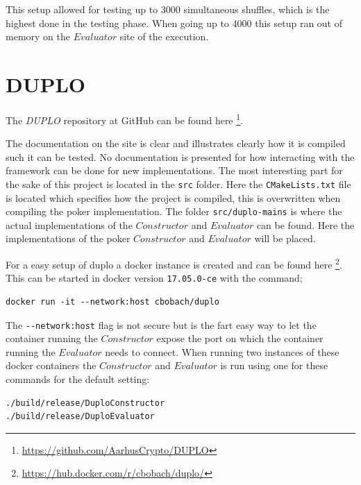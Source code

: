 \documentclass[twoside,11pt,openright]{report}
\newcommand{\DUPLO}{\textit{DUPLO} }
\begin{document}
\begin{appendices}
This setup allowed for testing up to 3000 simultaneous shuffles, which is the highest done in the testing phase. When going up to 4000 this setup ran out of memory on the $Evaluator$ site of the execution.


\section{DUPLO}
\label{app:duplo}
The \DUPLO repository at GitHub can be found here \footnote{\url{https://github.com/AarhusCrypto/DUPLO}}.

The documentation on the site is clear and illustrates clearly how it is compiled such it can be tested. No documentation is presented for how interacting with the framework can be done for new implementations. The most interesting part for the sake of this project is located in the \verb|src| folder. Here the \verb|CMakeLists.txt| file is located which specifies how the project is compiled, this is overwritten when compiling the poker implementation. The folder \verb|src/duplo-mains| is where the actual implementations of the $Constructor$ and $Evaluator$ can be found. Here the implementations of the poker $Constructor$ and $Evaluator$ will be placed.

\bigskip

For a easy setup of duplo a docker instance is created and can be found here \footnote{\url{https://hub.docker.com/r/cbobach/duplo/}}. This can be started in docker version \verb|17.05.0-ce| with the command;

\begin{center}
\begin{verbatim}
docker run -it --network:host cbobach/duplo
\end{verbatim}
\end{center}

The \verb|--network:host| flag is not secure but is the fart easy way to let the container running the $Constructor$ expose the port on which the container running the $Evaluator$ needs to connect. When running two instances of these docker containers the $Constructor$ and $Evaluator$ is run using one for these commands for the default setting:

\begin{center}
\begin{verbatim}
./build/release/DuploConstructor 
./build/release/DuploEvaluator
\end{verbatim}
\end{center}



\end{appendices}
\end{document}
